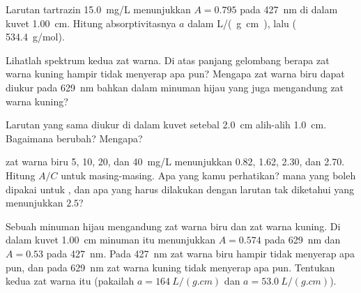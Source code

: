 \begin{exercise}[$\star\star$]\label{exo:g11:absorbance:9}
Larutan tartrazin \qty{15.0}{mg/L} menunjukkan $A = 0.795$ pada
\qty{427}{nm} di dalam kuvet \qty{1.00}{cm}. Hitung absorptivitasnya $a$
dalam \si{L/(g.cm)}, lalu  (
\qty{534.4}{g/mol}).
\end{exercise}

\begin{exercise}[$\star\star$]\label{exo:g11:absorbance:10}
Lihatlah spektrum kedua zat warna. Di atas panjang gelombang berapa zat
warna kuning hampir tidak menyerap apa pun? Mengapa zat warna biru dapat
diukur pada \qty{629}{nm} bahkan dalam minuman hijau yang juga
mengandung zat warna kuning?
\end{exercise}

\begin{exercise}[$\star\star$]\label{exo:g11:absorbance:11}
Larutan yang sama diukur di dalam kuvet setebal \qty{2.0}{cm} alih-alih
\qty{1.0}{cm}. Bagaimana  berubah? Mengapa?
\end{exercise}

\begin{exercise}[$\star\star\star$]\label{exo:g11:absorbance:12}
 zat warna biru 5, 10, 20, dan \qty{40}{mg/L} menunjukkan
0.82, 1.62, 2.30, dan 2.70. Hitung $A / C$ untuk masing-masing. Apa yang
kamu perhatikan?  mana yang boleh dipakai untuk , dan apa yang harus dilakukan dengan larutan tak diketahui
yang menunjukkan $2.5$?
\end{exercise}

\begin{exercise}[$\star\star\star$]\label{exo:g11:absorbance:13}
Sebuah minuman hijau mengandung zat warna biru dan zat warna kuning. Di
dalam kuvet \qty{1.00}{cm} minuman itu menunjukkan $A = 0.574$ pada
\qty{629}{nm} dan $A = 0.53$ pada \qty{427}{nm}. Pada \qty{427}{nm} zat
warna biru hampir tidak menyerap apa pun, dan pada \qty{629}{nm} zat
warna kuning tidak menyerap apa pun. Tentukan  kedua
zat warna itu (pakailah $a = \qty{164}{L/(g.cm)}$ dan
$a = \qty{53.0}{L/(g.cm)}$).
\end{exercise}

